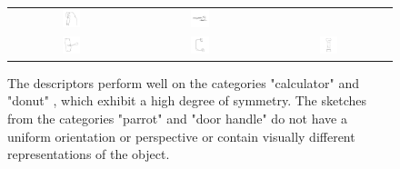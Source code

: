 \begin{figure}[h!]
{\begin{tabular}{ccc}
            \includegraphics[width=0.15\textwidth]{illustrations/sketch_examples/parrot_2.png} &
            \includegraphics[width=0.15\textwidth]{illustrations/sketch_examples/parrot_3.png} \\
            \includegraphics[width=0.15\textwidth]{illustrations/sketch_examples/doorhandle_1.png} &
            \includegraphics[width=0.15\textwidth]{illustrations/sketch_examples/doorhandle_2.png} &
            \includegraphics[width=0.15\textwidth]{illustrations/sketch_examples/doorhandle_3.png}
        \end{tabular}
        \label{fig:results_sketch_examples_bad}
    }
    \caption[Category Example Images]{
        The descriptors perform well on the categories "calculator" and "donut"
        , which exhibit a high degree
        of symmetry. The sketches from the categories "parrot" and "door
        handle"  do not have a uniform
        orientation or perspective or contain visually different
        representations of the object.
    }
    \label{fig:results_sketch_examples}
\end{figure}

